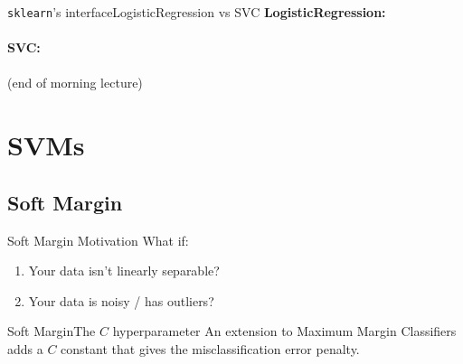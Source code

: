 \documentclass[xcolor=dvipsnames]{beamer}
\begin{document}
\begin{frame}{\texttt{sklearn}'s interface}{LogisticRegression vs SVC}
    {\bf LogisticRegression:}\\
    \href{http://scikit-learn.org/stable/modules/generated/sklearn.linear_model.LogisticRegression.html}{}\\
    \vspace{1em}
    {\bf SVC:}\\
    \href{http://scikit-learn.org/stable/modules/generated/sklearn.svm.SVC.html}{}\\
    \vspace{2em}
    (end of morning lecture)
\end{frame}


\section{SVMs}

\subsection{Soft Margin}

\begin{frame}{Soft Margin Motivation}
    \vspace{1em}
    What if:
    \begin{enumerate}
        \item Your data isn't linearly separable?
        \item Your data is noisy / has outliers?
    \end{enumerate}
    \vspace{2em}
\end{frame}

\begin{frame}{Soft Margin}{The $C$ hyperparameter}
    An extension to Maximum Margin Classifiers adds a $C$ constant that gives the misclassification error penalty.\\
    \vspace{3em}
\end{frame}
\end{document}
